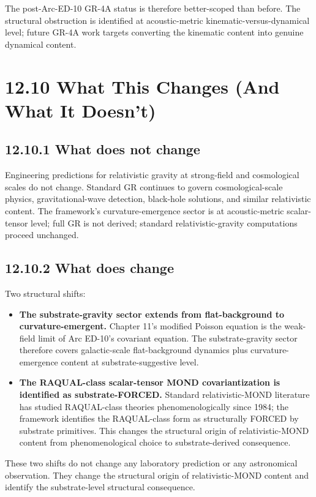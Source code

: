 \documentclass[11pt]{book}
\begin{document}
The post-Arc-ED-10 GR-4A status is therefore better-scoped than before. The structural obstruction is identified at acoustic-metric kinematic-versus-dynamical level; future GR-4A work targets converting the kinematic content into genuine dynamical content.

\section{12.10 What This Changes (And What It Doesn't)}

\subsection{12.10.1 What does not change}

Engineering predictions for relativistic gravity at strong-field and cosmological scales do not change. Standard GR continues to govern cosmological-scale physics, gravitational-wave detection, black-hole solutions, and similar relativistic content. The framework's curvature-emergence sector is at acoustic-metric scalar-tensor level; full GR is not derived; standard relativistic-gravity computations proceed unchanged.

\subsection{12.10.2 What does change}

Two structural shifts:

\begin{itemize}
\item \textbf{The substrate-gravity sector extends from flat-background to curvature-emergent.} Chapter 11's modified Poisson equation is the weak-field limit of Arc ED-10's covariant equation. The substrate-gravity sector therefore covers galactic-scale flat-background dynamics plus curvature-emergence content at substrate-suggestive level.
\item \textbf{The RAQUAL-class scalar-tensor MOND covariantization is identified as substrate-FORCED.} Standard relativistic-MOND literature has studied RAQUAL-class theories phenomenologically since 1984; the framework identifies the RAQUAL-class form as structurally FORCED by substrate primitives. This changes the structural origin of relativistic-MOND content from phenomenological choice to substrate-derived consequence.
\end{itemize}

These two shifts do not change any laboratory prediction or any astronomical observation. They change the structural origin of relativistic-MOND content and identify the substrate-level structural consequence.
\end{document}
